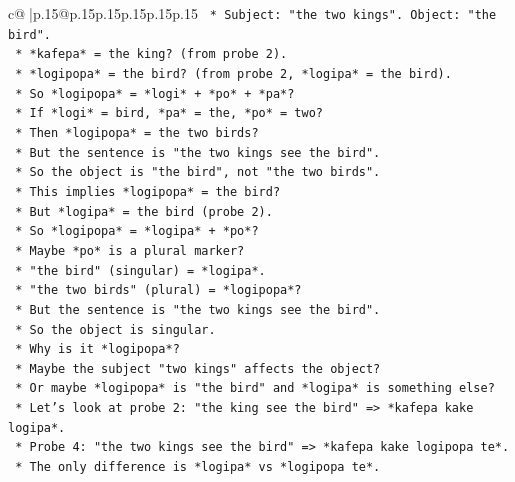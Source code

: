 \documentclass{article}
\begin{document}
{\begin{supertabular}{c@{$\;$}|p{.15\linewidth}@{}p{.15\linewidth}p{.15\linewidth}p{.15\linewidth}p{.15\linewidth}p{.15\linewidth}}
{{{\texttt{                    *   Subject: "the two kings". Object: "the bird".} \\
\texttt{                    *   *kafepa* = the king? (from probe 2).} \\
\texttt{                    *   *logipopa* = the bird? (from probe 2, *logipa* = the bird).} \\
\texttt{                    *   So *logipopa* = *logi* + *po* + *pa*?} \\
\texttt{                    *   If *logi* = bird, *pa* = the, *po* = two?} \\
\texttt{                    *   Then *logipopa* = the two birds?} \\
\texttt{                    *   But the sentence is "the two kings see the bird".} \\
\texttt{                    *   So the object is "the bird", not "the two birds".} \\
\texttt{                    *   This implies *logipopa* = the bird?} \\
\texttt{                    *   But *logipa* = the bird (probe 2).} \\
\texttt{                    *   So *logipopa* = *logipa* + *po*?} \\
\texttt{                    *   Maybe *po* is a plural marker?} \\
\texttt{                    *   "the bird" (singular) = *logipa*.} \\
\texttt{                    *   "the two birds" (plural) = *logipopa*?} \\
\texttt{                    *   But the sentence is "the two kings see the bird".} \\
\texttt{                    *   So the object is singular.} \\
\texttt{                    *   Why is it *logipopa*?} \\
\texttt{                    *   Maybe the subject "two kings" affects the object?} \\
\texttt{                    *   Or maybe *logipopa* is "the bird" and *logipa* is something else?} \\
\texttt{                    *   Let's look at probe 2: "the king see the bird" => *kafepa kake logipa*.} \\
\texttt{                    *   Probe 4: "the two kings see the bird" => *kafepa kake logipopa te*.} \\
\texttt{                    *   The only difference is *logipa* vs *logipopa te*.} \\
}}}
\end{supertabular}}
\end{document}
